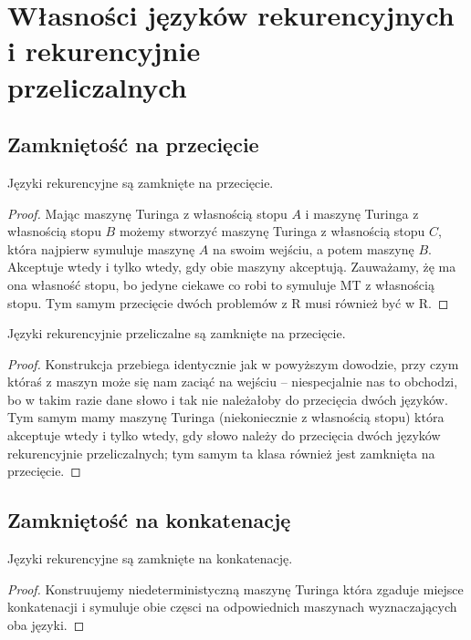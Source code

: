 \section{Własności języków rekurencyjnych i rekurencyjnie\texorpdfstring{\\}{}przeliczalnych}

\subsection{Zamkniętość na przecięcie}

\begin{theorem}
	Języki rekurencyjne są zamknięte na przecięcie.
\end{theorem}

\begin{proof}
	Mając maszynę Turinga z własnością stopu \(A\) i maszynę Turinga z własnością stopu \(B\) możemy stworzyć maszynę Turinga z własnością stopu \(C\), która najpierw symuluje maszynę \(A\) na swoim wejściu, a potem maszynę \(B\). Akceptuje wtedy i tylko wtedy, gdy obie maszyny akceptują. Zauważamy, żę ma ona własność stopu, bo jedyne ciekawe co robi to symuluje MT z własnością stopu. Tym samym przecięcie dwóch problemów z R musi również być w R.
\end{proof}

\begin{theorem}
	Języki rekurencyjnie przeliczalne są zamknięte na przecięcie.
\end{theorem}
\begin{proof}
	Konstrukcja przebiega identycznie jak w powyższym dowodzie, przy czym któraś z maszyn może się nam zaciąć na wejściu -- niespecjalnie nas to obchodzi, bo w takim razie dane słowo i tak nie należałoby do przecięcia dwóch języków. Tym samym mamy maszynę Turinga (niekoniecznie z własnością stopu) która akceptuje wtedy i tylko wtedy, gdy słowo należy do przecięcia dwóch języków rekurencyjnie przeliczalnych; tym samym ta klasa również jest zamknięta na przecięcie.
\end{proof}

\subsection{Zamkniętość na konkatenację}

\begin{theorem}
	Języki rekurencyjne są zamknięte na konkatenację.
\end{theorem}

\begin{proof}
	Konstruujemy niedeterministyczną maszynę Turinga która zgaduje miejsce konkatenacji i symuluje obie częsci na odpowiednich maszynach wyznaczających oba języki.
\end{proof}

